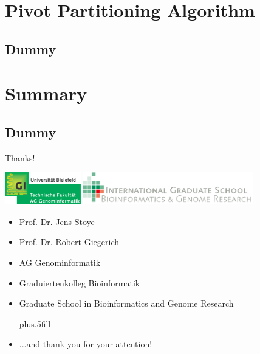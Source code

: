 \documentclass{beamer}
\begin{document}
\section[Pivot Partitioning]{Pivot Partitioning Algorithm}
\subsection{Dummy}


\section*{Summary}
\subsection*{Dummy}


\begin{frame}{Thanks!}

  \centerline{
    \includegraphics[height=1.4cm]{aggi_logo.png}
    \hspace*{0.6cm}
    \includegraphics[height=1.4cm]{gsbg_logo.png}
  }

  \begin{itemize}
    \item Prof. Dr. Jens Stoye
    \item Prof. Dr. Robert Giegerich
    \item AG Genominformatik
    \item Graduiertenkolleg Bioinformatik
    \item Graduate School in Bioinformatics and Genome Research
    
    \vskip0pt plus.5fill
    
    \item ...and \alert{thank you} for your attention!
  \end{itemize}
  
\end{frame}
\end{document}

